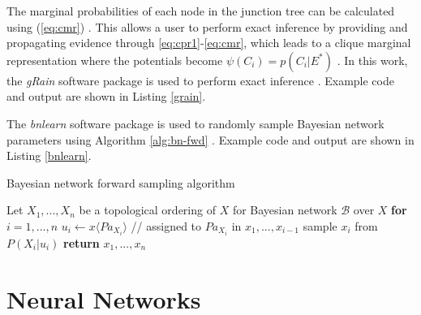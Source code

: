 \noindent The marginal probabilities of each node in the junction tree can be calculated using (\ref{eq:cmr}) \cite{lauritzen1988}.
This allows a user to perform exact inference by providing and propagating evidence through \ref{eq:cpr1}-\ref{eq:cmr}, which leads to a clique marginal representation where the potentials become $\psi(C_{i}) = p(C_{i} | E^{*})$ \cite{lauritzen1988}.
In this work, the \textit{gRain} \cite{grain} software package is used to perform exact inference \cite{hojsgaard}.
Example code and output are shown in Listing \ref{grain}.

\vspace{+1.1cm}


\vspace{+0.6cm}
\noindent The \textit{bnlearn} \cite{bnlearn} software package is used to randomly sample Bayesian network parameters using Algorithm \ref{alg:bn-fwd} \cite{koller, scutari}.
Example code and output are shown in Listing \ref{bnlearn}.

\vspace{+0.6cm}
\begin{algorithm}[H]
  \centering
  \caption{Bayesian network forward sampling algorithm \cite{koller}}
  \label{alg:bn-fwd}
  \begin{algorithmic}
    \STATE Let $X_{1}, ..., X_{n}$ be a topological ordering of $X$ for Bayesian network $\mathcal{B}$ over $X$
    \STATE \textbf{for} $i = 1, ..., n$
    \STATE \hspace{\algorithmicindent} $u_{i} \leftarrow x \langle Pa_{X_{i}} \rangle $ // assigned to $Pa_{X_{i}}$ in $x_{1}, ..., x_{i - 1}$
    \STATE \hspace{\algorithmicindent} sample $x_{i}$ from $P(X_{i} | u_{i})$
    \STATE \textbf{return} $x_{1}, ..., x_{n}$
  \end{algorithmic}
\end{algorithm}

\vspace{+0.6cm}



\section{Neural Networks}

